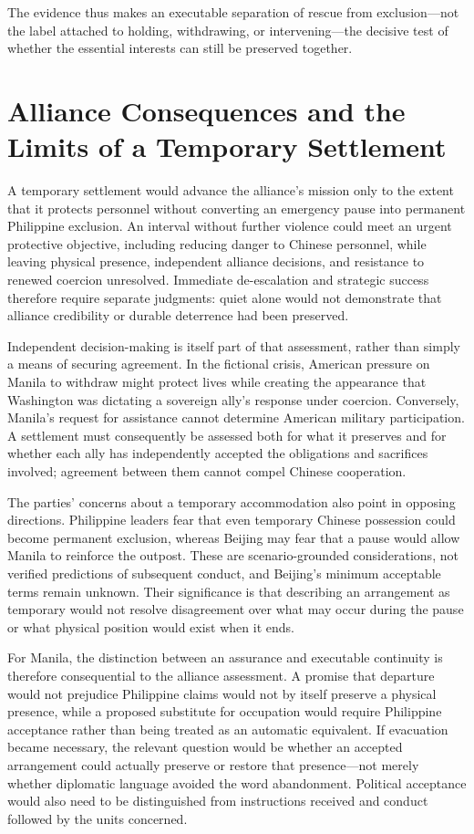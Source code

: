 \documentclass[11pt]{article}
\begin{document}
The evidence thus makes an executable separation of rescue from exclusion—not the label attached to holding, withdrawing, or intervening—the decisive test of whether the essential interests can still be preserved together.

\section{Alliance Consequences and the Limits of a Temporary Settlement}
A temporary settlement would advance the alliance’s mission only to the extent that it protects personnel without converting an emergency pause into permanent Philippine exclusion. An interval without further violence could meet an urgent protective objective, including reducing danger to Chinese personnel, while leaving physical presence, independent alliance decisions, and resistance to renewed coercion unresolved. Immediate de-escalation and strategic success therefore require separate judgments: quiet alone would not demonstrate that alliance credibility or durable deterrence had been preserved.

Independent decision-making is itself part of that assessment, rather than simply a means of securing agreement. In the fictional crisis, American pressure on Manila to withdraw might protect lives while creating the appearance that Washington was dictating a sovereign ally’s response under coercion. Conversely, Manila’s request for assistance cannot determine American military participation. A settlement must consequently be assessed both for what it preserves and for whether each ally has independently accepted the obligations and sacrifices involved; agreement between them cannot compel Chinese cooperation.

The parties’ concerns about a temporary accommodation also point in opposing directions. Philippine leaders fear that even temporary Chinese possession could become permanent exclusion, whereas Beijing may fear that a pause would allow Manila to reinforce the outpost. These are scenario-grounded considerations, not verified predictions of subsequent conduct, and Beijing’s minimum acceptable terms remain unknown. Their significance is that describing an arrangement as temporary would not resolve disagreement over what may occur during the pause or what physical position would exist when it ends.

For Manila, the distinction between an assurance and executable continuity is therefore consequential to the alliance assessment. A promise that departure would not prejudice Philippine claims would not by itself preserve a physical presence, while a proposed substitute for occupation would require Philippine acceptance rather than being treated as an automatic equivalent. If evacuation became necessary, the relevant question would be whether an accepted arrangement could actually preserve or restore that presence—not merely whether diplomatic language avoided the word abandonment. Political acceptance would also need to be distinguished from instructions received and conduct followed by the units concerned.
\end{document}

